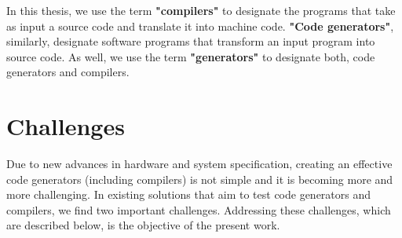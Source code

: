 In this thesis, we use the term \textbf{"compilers"} to designate the programs that take as input a source code and translate it into machine code. \textbf{"Code generators"}, similarly, designate software programs that transform an input program into source code. As well, we use the term \textbf{"generators"} to designate both, code generators and compilers. 

\section{Challenges}
Due to new advances in hardware and system specification, creating an effective code generators (including compilers) is not simple and it is becoming more and more challenging.
In existing solutions that aim to test code generators and compilers, we find two important challenges. Addressing these challenges, which are described below, is the objective of the present work.
